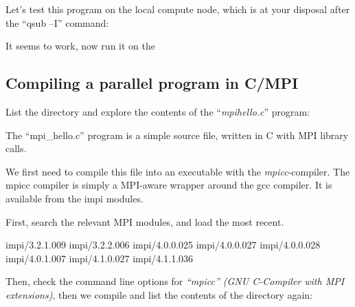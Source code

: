 Let's test this program on the local compute node, which is at your disposal
after the ``qsub --I'' command:



It seems to work, now run it on the \hpc
\begin{prompt}
\end{prompt}

\subsection{Compiling a parallel program in C/MPI}

\begin{prompt}
\end{prompt}

List the directory and explore the contents of the ``\textit{mpihello.c}'' program:


The ``mpi\_hello.c'' program is a simple source file, written in C with MPI library calls.

We first need to compile this file into an executable with the
\emph{mpicc}-compiler. The mpicc compiler is simply a MPI-aware wrapper
around the gcc compiler. It is available from the impi modules.

First, search the relevant MPI modules, and load the most recent.
\begin{prompt}
impi/3.2.1.009
impi/3.2.2.006
impi/4.0.0.025
impi/4.0.0.027
impi/4.0.0.028
impi/4.0.1.007
impi/4.1.0.027
impi/4.1.1.036
\end{prompt}

Then, check the command line options for \emph{``mpicc'' (GNU C-Compiler with
MPI extensions)}, then we compile and list the contents of the directory again:

\begin{prompt}
\end{prompt}

